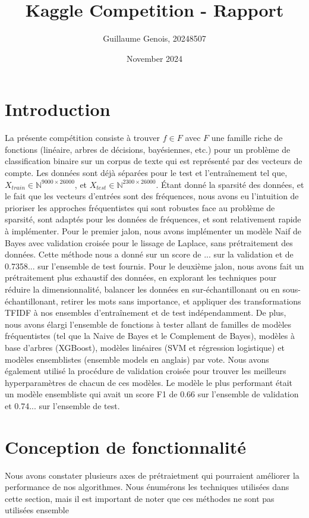 \documentclass{article}
\title{Kaggle Competition - Rapport}
\author{Guillaume Genois, 20248507}
\date{November 2024}
\begin{document}
\maketitle

\section{Introduction}
La présente compétition consiste à trouver $f \in F$ avec $F$ une famille riche de fonctions (linéaire, arbres de décisions, bayésiennes, etc.) pour un problème de classification binaire sur un corpus de texte qui est représenté par des vecteurs de compte. Les données sont déjà séparées pour le test et l'entraînement tel que, $X_{train} \in \mathbb{N}^{9000 \times 26000}$, et $X_{test} \in \mathbb{N}^{2300 \times 26000}$. Étant donné la sparsité des données, et le fait que les vecteurs d'entrées sont des fréquences, nous avons eu l'intuition de prioriser les approches fréquentistes qui sont robustes face au problème de sparsité, sont adaptés pour les données de fréquences, et sont relativement rapide à implémenter. Pour le premier jalon, nous avons implémenter un modèle Naif de Bayes avec validation croisée pour le lissage de Laplace, sans prétraitement des données. Cette méthode nous a donné sur un score de ... sur la validation et de 0.7358... sur l'ensemble de test fournis. Pour le deuxième jalon, nous avons fait un prétraitement plus exhaustif des données, en explorant les techniques pour réduire la dimensionnalité, balancer les données en sur-échantillonant ou en sous-échantillonant, retirer les mots sans importance, et appliquer des transformations TFIDF à nos ensembles d'entraînement et de test indépendamment. De plus, nous avons élargi l'ensemble de fonctions à tester allant de familles de modèles fréquentistes (tel que la Naive de Bayes et le Complement de Bayes), modèles à base d'arbres (XGBoost), modèles linéaires (SVM et régression logistique) et modèles ensemblistes (ensemble models en anglais) par vote. Nous avons également utilisé la procédure de validation croisée pour trouver les meilleurs hyperparamètres de chacun de ces modèles. Le modèle le plus performant était un modèle ensembliste qui avait un score F1 de 0.66 sur l'ensemble de validation et 0.74... sur l'ensemble de test.

\section{Conception de fonctionnalité}
Nous avons constater plusieurs axes de prétraietment qui pourraient améliorer la performance de nos algorithmes. Nous énumérons les techniques utilisées dans cette section, mais il est important de noter que ces méthodes ne sont pas utilisées ensemble 
\end{document}
